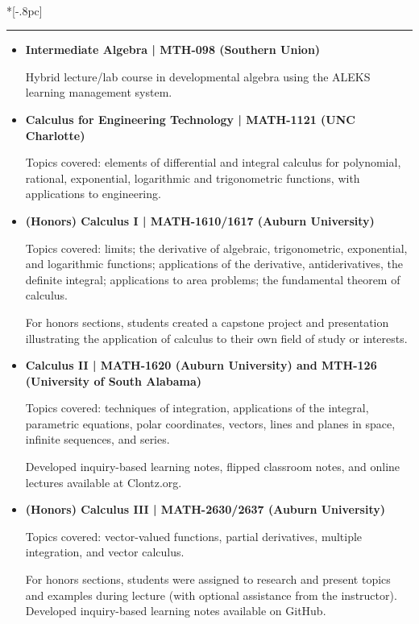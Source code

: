 \documentclass{article}
\newcommand{\headerText}[1]{
  \noindent{\large \bf #1} \\*[-.8pc]
  \rule{\textwidth}{.1pt}}
\begin{document}
\newpage


\headerText{Teaching}
\begin{itemize}
  \item
    \textbf{Intermediate Algebra | MTH-098 (Southern Union)}

    Hybrid lecture/lab course in
    developmental algebra using the ALEKS learning management system.

  \item
    \textbf{Calculus for Engineering Technology | MATH-1121 (UNC Charlotte)}

    Topics covered: elements of differential and integral calculus for
    polynomial, rational, exponential, logarithmic and trigonometric
    functions, with applications to engineering.

  \item
    \textbf{(Honors) Calculus I | MATH-1610/1617 (Auburn University)}

    Topics covered: limits; the derivative of algebraic, trigonometric,
    exponential, and logarithmic functions; applications of the derivative,
    antiderivatives, the definite integral; applications to area problems;
    the fundamental theorem of calculus.

    For honors sections, students
    created a capstone project and presentation illustrating the application
    of calculus to their own field of study or interests.

  \item
    \textbf{Calculus II | MATH-1620 (Auburn University) and MTH-126 (University of South Alabama)}

    Topics covered: techniques of integration, applications of the integral,
    parametric equations, polar coordinates, vectors, lines and planes in space,
    infinite sequences, and series.

    Developed inquiry-based learning notes, flipped classroom notes, and
    online lectures available at Clontz.org.

  \item
    \textbf{(Honors) Calculus III | MATH-2630/2637 (Auburn University)}

    Topics covered: vector-valued functions, partial derivatives,
    multiple integration, and vector calculus.

    For honors sections, students were assigned to research and present
    topics and examples during lecture (with optional assistance from the
    instructor).
    Developed inquiry-based learning notes available on GitHub.


\end{itemize}
\end{document}
